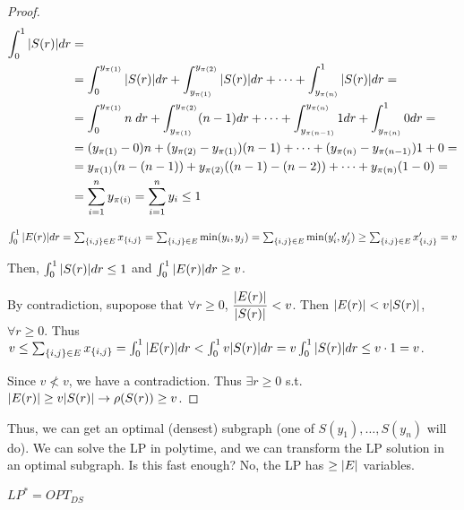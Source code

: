 \begin{proof}
        \begin{equation*}
            \begin{split}
                \int_0^1 \vert S(r) \vert dr &=\\
                    &= \int_{0}^{y_{\pi(1)}} \vert S(r) \vert dr + \int_{y_{\pi(1)}}^{y_{\pi(2)}} \vert S(r) \vert dr + \cdots + \int_{y_{\pi(n)}}^{1} \vert S(r) \vert dr =\\
                    &= \int_{0}^{y_{\pi(1)}} n \; dr + \int_{y_{\pi(1)}}^{y_{\pi(2)}} (n-1)dr + \cdots + \int_{y_{\pi(n-1)}}^{y_{\pi(n)}} 1 dr + \int_{y_{\pi(n)}}^{1} 0 dr =\\
                    &= (y_{\pi(1)} - 0)n + (y_{\pi(2)} - y_{\pi(1)})(n-1) + \cdots + (y_{\pi(n)} - y_{\pi(n-1)})1 + 0 =\\
                    &= y_{\pi(1)} (n - (n-1)) + y_{\pi(2)}((n-1) - (n-2)) + \cdots + y_{\pi(n)}(1-0) =\\
                    &= \sum_{i=1}^{n} y_{\pi(i)} = \sum_{i=1}^{n} y_i \leq 1
            \end{split}
        \end{equation*}

        $  \int_0^1 \vert E(r) \vert dr = \sum_{\{i,j\} \in E} x_{\{i,j\}} = \sum_{\{i,j\} \in E} \min(y_i, y_j) = \sum_{\{i,j\} \in E} \min(y_i', y_j') \geq \sum_{\{i,j\} \in E} x_{\{i,j\}}' = v $

        Then, $\int_0^1 \vert S(r) \vert dr \leq 1$ and $\int_0^1 \vert E(r) \vert dr \geq v$.

        By contradiction, supopose that $\forall r \geq 0$, $\dfrac{\vert E(r) \vert}{\vert S(r) \vert} < v$.
        Then $\vert E(r) \vert < v \vert S(r) \vert$, $\forall r \geq 0$.
        Thus $v \leq \sum_{\{i,j\} \in E} x_{\{i,j\}} = \int_0^1 \vert E(r) \vert dr < \int_0^1 v \vert S(r) \vert dr = v \int_0^1 \vert S(r) \vert dr \leq v \cdot 1 = v$.

        Since $v \not< v$, we have a contradiction.
        Thus $\exists r \geq 0$ s.t. $\vert E(r) \vert \geq v \vert S(r) \vert \rightarrow \rho(S(r)) \geq v$.
    \end{proof}

    Thus, we can get an optimal (densest) subgraph (one of $S(y_1), \dots, S(y_n)$ will do).
    We can solve the LP in polytime, and we can transform the LP solution in an optimal subgraph.
    Is this fast enough? No, the LP has $\geq \vert E \vert$ variables.

    \begin{corollary}
        $LP^* = OPT_{DS}$
    \end{corollary}

